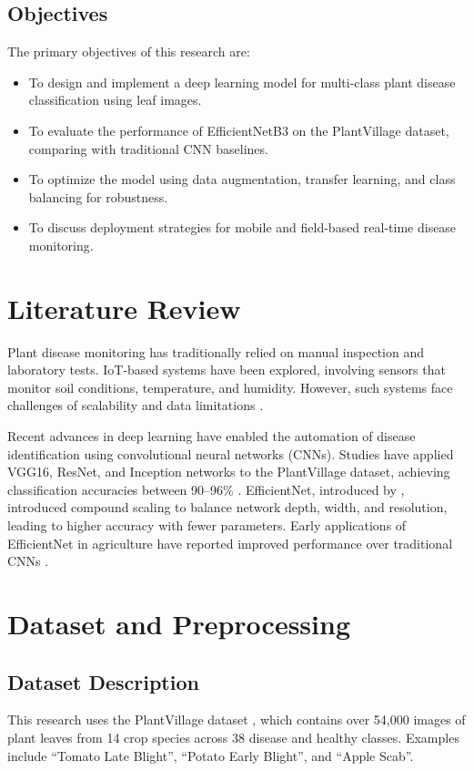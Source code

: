 \documentclass[12pt,a4paper]{report}
\begin{document}
\begin{List of Abbreviations}
\section{Objectives}
The primary objectives of this research are:
\begin{itemize}
    \item To design and implement a deep learning model for multi-class plant disease classification using leaf images.
    \item To evaluate the performance of EfficientNetB3 on the PlantVillage dataset, comparing with traditional CNN baselines.
    \item To optimize the model using data augmentation, transfer learning, and class balancing for robustness.
    \item To discuss deployment strategies for mobile and field-based real-time disease monitoring.
\end{itemize}

\chapter{Literature Review}
Plant disease monitoring has traditionally relied on manual inspection and laboratory tests. IoT-based systems have been explored, involving sensors that monitor soil conditions, temperature, and humidity. However, such systems face challenges of scalability and data limitations \citep{Pantazi2019}. 

Recent advances in deep learning have enabled the automation of disease identification using convolutional neural networks (CNNs). Studies have applied VGG16, ResNet, and Inception networks to the PlantVillage dataset, achieving classification accuracies between 90--96\% \citep{Mohanty2016, Ferentinos2018}. EfficientNet, introduced by \citet{Tan2019}, introduced compound scaling to balance network depth, width, and resolution, leading to higher accuracy with fewer parameters. Early applications of EfficientNet in agriculture have reported improved performance over traditional CNNs \citep{Too2019}.

\chapter{Dataset and Preprocessing}
\section{Dataset Description}
This research uses the PlantVillage dataset \citep{Hughes2015}, which contains over 54,000 images of plant leaves from 14 crop species across 38 disease and healthy classes. Examples include ``Tomato Late Blight'', ``Potato Early Blight'', and ``Apple Scab''.


\end{List of Abbreviations}
\end{document}
